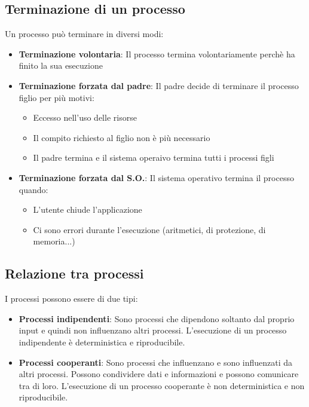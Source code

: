 \documentclass[a4paper]{article}
\begin{document}
\subsection{Terminazione di un processo}
Un processo può terminare in diversi modi:
\begin{itemize}
  \item \textbf{Terminazione volontaria}: Il processo termina volontariamente
    perchè ha finito la sua esecuzione

  \item \textbf{Terminazione forzata dal padre}: Il padre decide di terminare il
    processo figlio per più motivi:
    \begin{itemize}
      \item Eccesso nell'uso delle risorse
      \item Il compito richiesto al figlio non è più necessario
      \item Il padre termina e il sistema operaivo termina tutti i processi figli
    \end{itemize}

  \item \textbf{Terminazione forzata dal S.O.}: Il sistema operativo termina il
    processo quando:
    \begin{itemize}
      \item L'utente chiude l'applicazione
      \item Ci sono errori durante l'esecuzione (aritmetici, di protezione, di memoria...)
    \end{itemize}
\end{itemize}

\subsection{Relazione tra processi}
I processi possono essere di due tipi:
\begin{itemize}
  \item \textbf{Processi indipendenti}: Sono processi che dipendono soltanto dal proprio
    input e quindi non influenzano altri processi. L'esecuzione di un processo indipendente
    è deterministica e riproducibile.

  \item \textbf{Processi cooperanti}: Sono processi che influenzano e sono influenzati da
    altri processi. Possono condividere dati e informazioni e possono comunicare tra di
    loro. L'esecuzione di un processo cooperante è non deterministica e non riproducibile.
\end{itemize}
\end{document}
